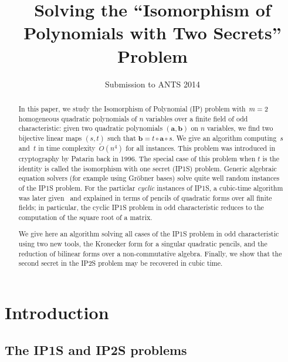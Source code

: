 \documentclass{lms}%
\def\Ot{\widetilde{O}}
\begin{document}
\title[Solving ``Isomorphism of Polynomials with Two Secrets'']%
{Solving the ``Isomorphism of Polynomials with Two Secrets'' Problem}%
\author{Submission to ANTS 2014}
\maketitle

\begin{abstract}%
In this paper, we study the Isomorphism of Polynomial (IP) problem
with~$m=2$ homogeneous quadratic polynomials of $n$ variables over a finite field of odd
characteristic: given two quadratic polynomials $(\bm{a},\bm{b})$ 
on $n$ variables, we find two bijective linear maps $(s,t)$ such that
$\bm{b}=t\circ \bm{a}\circ s$. We give an algorithm computing~$s$ and~$t$
in time complexity~$\Ot(n^4)$ for all instances.
This problem was introduced in cryptography by Patarin back in 1996.
The special case of this problem when $t$ is the identity is called
the isomorphism with one secret (IP1S) problem.
Generic algebraic equation solvers (for example using Gröbner bases)
solve quite well random instances of the IP1S problem. For the particlar
\emph{cyclic} instances of IP1S, a cubic-time algorithm was later
given~\cite{MPG2013} and explained in terms of pencils of quadratic forms
over all finite fields; in particular, the cyclic IP1S problem in odd
characteristic reduces to the computation of the square root of a matrix.

We give here an algorithm solving all cases of the IP1S problem in odd
characteristic using two new tools, the Kronecker form for a singular
quadratic pencils, and the reduction of bilinear forms over a non-commutative
algebra. Finally, we show that the second secret in the IP2S problem may
be recovered in cubic time.
\end{abstract}%
\section*{Introduction}%
\subsection*{The IP1S and IP2S problems}%
\end{document}
